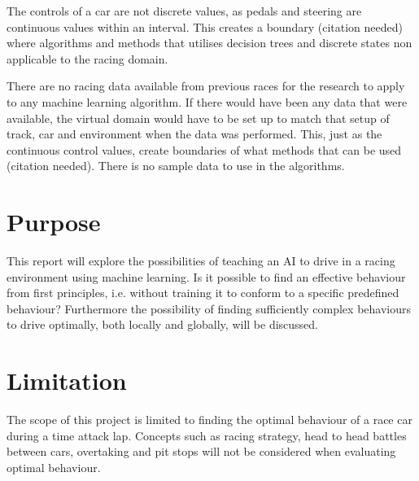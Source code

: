 The controls of a car are not discrete values, as pedals and steering are continuous values within an interval. This creates a boundary (citation needed) where algorithms and methods that utilises decision trees and discrete states non applicable to the racing domain. 

There are no racing data available from previous races for the research to apply to any machine learning algorithm. If there would have been any data that were available, the virtual domain would have to be set up to match that setup of track, car and environment when the data was performed. This, just as the continuous control values, create boundaries of what methods that can be used (citation needed). There is no sample data to use in the algorithms. 

\section{Purpose}
This report will explore the possibilities of teaching an AI to drive in a racing environment using machine learning. Is it possible to find an effective behaviour from first principles, i.e. without training it to conform to a specific predefined behaviour? Furthermore the possibility of finding sufficiently complex behaviours to drive optimally, both locally and globally, will be discussed. 


\section{Limitation}

The scope of this project is limited to finding the optimal behaviour of a race car during a time attack lap. Concepts such as racing strategy, head to head battles between cars, overtaking and pit stops will not be considered when evaluating optimal behaviour.

